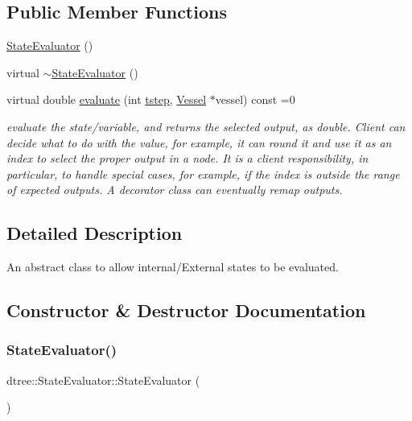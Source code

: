 \subsection*{Public Member Functions}
\begin{DoxyCompactItemize}
\item 
\mbox{\hyperlink{classdtree_1_1_state_evaluator_a284f187192ec9115324cc899299e88b1}{State\+Evaluator}} ()
\item 
virtual \mbox{\hyperlink{classdtree_1_1_state_evaluator_ad64f28b5b6456b2e1ca1c9021e39b5d4}{$\sim$\+State\+Evaluator}} ()
\item 
virtual double \mbox{\hyperlink{classdtree_1_1_state_evaluator_ab57666219fbdc728f40d9d5acd5726cb}{evaluate}} (int \mbox{\hyperlink{thread__vessels_8cpp_a84bc73d278de929ec9974e1a95d9b23a}{tstep}}, \mbox{\hyperlink{class_vessel}{Vessel}} $\ast$vessel) const =0
\begin{DoxyCompactList}\small\item\em evaluate the state/variable, and returns the selected output, as double. Client can decide what to do with the value, for example, it can round it and use it as an index to select the proper output in a node. It is a client responsibility, in particular, to handle special cases, for example, if the index is outside the range of expected outputs. A decorator class can eventually remap outputs. \end{DoxyCompactList}\end{DoxyCompactItemize}


\subsection{Detailed Description}
An abstract class to allow internal/\+External states to be evaluated. 

\subsection{Constructor \& Destructor Documentation}
\mbox{\label{classdtree_1_1_state_evaluator_a284f187192ec9115324cc899299e88b1}} 
\subsubsection{\texorpdfstring{StateEvaluator()}{StateEvaluator()}}
{\footnotesize\ttfamily dtree\+::\+State\+Evaluator\+::\+State\+Evaluator (\begin{DoxyParamCaption}{ }\end{DoxyParamCaption})\hspace{0.3cm}{\ttfamily [inline]}}

